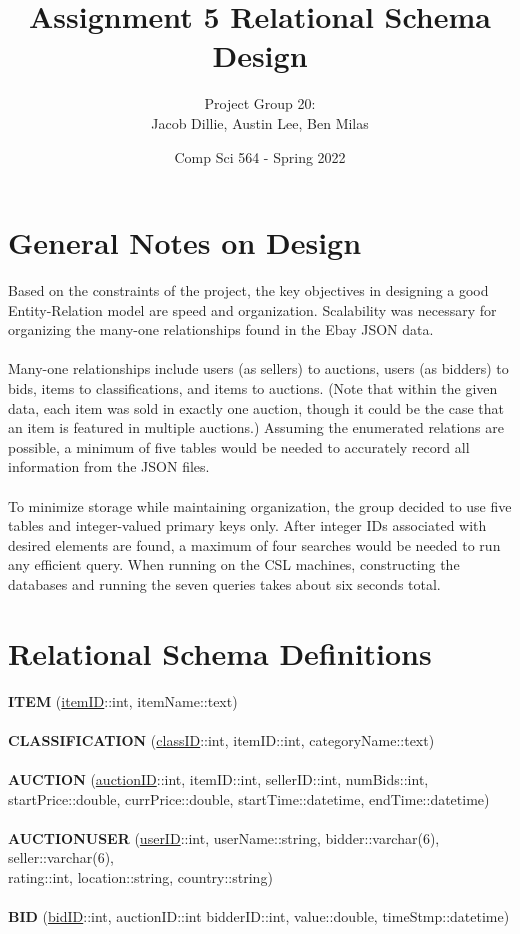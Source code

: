 \documentclass{article}
\title{Assignment 5 Relational Schema Design}
\author{Project Group 20:\\Jacob Dillie, Austin Lee, Ben Milas}
\date{Comp Sci 564 - Spring 2022}
\newcommand\tab[1][1cm]{\hspace*{#1}}
\begin{document}
\maketitle
\section*{General Notes on Design}
Based on the constraints of the project, the key objectives in designing a good Entity-Relation model are speed and organization. Scalability was necessary for organizing the many-one relationships found in the Ebay JSON data.
\\\\
Many-one relationships include users (as sellers) to auctions, users (as bidders) to bids, items to classifications, and items to auctions. (Note that within the given data, each item was sold in exactly one auction, though it could be the case that an item is featured in multiple auctions.) Assuming the enumerated relations are possible, a minimum of five tables would be needed to accurately record all information from the JSON files.
\\\\
To minimize storage while maintaining organization, the group decided to use five tables and integer-valued primary keys only. After integer IDs associated with desired elements are found, a maximum of four searches would be needed to run any efficient query. When running on the CSL machines, constructing the databases and running the seven queries takes about six seconds total.
\section*{Relational Schema Definitions}
\textbf{ITEM} (\underline{itemID}::int, itemName::text)\\\\
\textbf{CLASSIFICATION} (\underline{classID}::int, itemID::int, categoryName::text)\\\\
\textbf{AUCTION} (\underline{auctionID}::int, itemID::int, sellerID::int, numBids::int, startPrice::double, \tab\tab currPrice::double, startTime::datetime, endTime::datetime)\\\\
\textbf{AUCTIONUSER} (\underline{userID}::int, userName::string, bidder::varchar(6), seller::varchar(6),\\ \tab\tab\tab rating::int, location::string, country::string)\\\\
\textbf{BID} (\underline{bidID}::int, auctionID::int bidderID::int, value::double, timeStmp::datetime)
\\
\pagebreak{}
\end{document}
